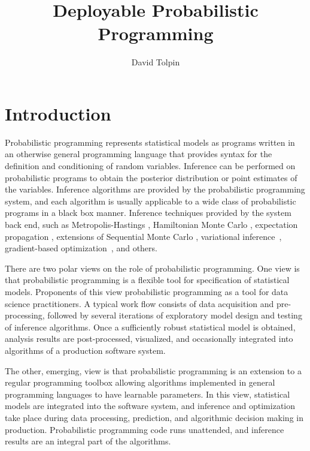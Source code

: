 \documentclass[sigplan,review,10pt,anonymous]{acmart}
\title{Deployable Probabilistic Programming}
\author{David Tolpin}
\affiliation{
    \institution{PUB+}
    \country{Israel}
}
\begin{document}
\maketitle

\begin{sloppypar}

\section{Introduction}

	Probabilistic programming \cite{GMR+08,MSP14,WVM14,GS15} represents
	statistical models as programs written in an otherwise
	general programming language that provides syntax for the
	definition and conditioning of random variables. Inference can be
	performed on probabilistic programs to obtain the posterior
	distribution or point estimates of the variables. Inference
	algorithms are provided by the probabilistic programming system,
	and each algorithm is usually applicable to a wide class of
	probabilistic programs in a black box manner.  Inference
	techniques provided by the system back end, such as
	Metropolis-Hastings \cite{WSG11,MSP14,YHG14}, Hamiltonian Monte
	Carlo \cite{SDT14}, expectation propagation \cite{MWG+10},
	extensions of Sequential Monte Carlo \cite{WVM14,MYM+15,PWD+14},
	variational inference~\cite{}, gradient-based
	optimization~\cite{}, and others.

	There are two polar views on the role of probabilistic programming.
	One view is that probabilistic programming is a flexible tool for
	specification of statistical models. Proponents of this view
	probabilistic programming as a tool for data science
	practitioners. A typical work flow consists of data acquisition
	and pre-processing, followed by several iterations of exploratory
	model design and testing of inference algorithms. Once a
	sufficiently robust statistical model is obtained, analysis
	results are post-processed, visualized, and occasionally
	integrated into algorithms of a production software system. 

	The other, emerging, view is that probabilistic programming is an
	extension to a regular programming toolbox allowing
	algorithms implemented in general programming languages to
	have learnable parameters. In this view, statistical 
	models are integrated into the software system, and inference
	and optimization take place during data processing, prediction,
	and algorithmic decision making in production.  Probabilistic
	programming code runs unattended, and inference results are an
	integral part of the algorithms.


\end{sloppypar}
\end{document}
